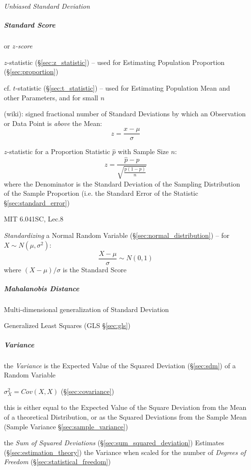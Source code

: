 \emph{Unbiased Standard Deviation}



\subparagraph{Standard Score}\label{sec:standard_score}\hfill

or \emph{$z$-score}

$z$-statistic (\S\ref{sec:z_statistic}) -- used for Estimating Population
Proportion (\S\ref{sec:proportion})

cf. $t$-statistic (\S\ref{sec:t_statistic}) -- used for Estimating Population
Mean and other Parameters, and for small $n$

(wiki): signed fractional number of Standard Deviations by which an Observation
or Data Point is \emph{above} the Mean:
\[
  z = \frac{x - \mu}{\sigma}
\]

$z$-statistic for a Proportion Statistic $\hat{p}$ with Sample Size $n$:
\[
  z = \frac{\hat{p} - p}{\sqrt{\frac{p(1-p)}{n}}}
\]
where the Denominator is the Standard Deviation of the Sampling Distribution of
the Sample Proportion (i.e. the Standard Error of the Statistic
\S\ref{sec:standard_error})

MIT 6.041SC, Lec.8

\emph{Standardizing} a Normal Random Variable (\S\ref{sec:normal_distribution})
-- for $X \sim N(\mu, \sigma^2)$:
\[
  \frac{X - \mu}{\sigma} \sim N(0, 1)
\]
where $(X - \mu)/\sigma$ is the Standard Score



\subparagraph{Mahalanobis Distance}\label{sec:mahalanobis_distance}\hfill

Multi-dimensional generalization of Standard Deviation

Generalized Least Squares (GLS \S\ref{sec:gls})



\subparagraph{Variance}\label{sec:variance}\hfill

the \emph{Variance} is the Expected Value of the Squared Deviation
(\S\ref{sec:sdm}) of a Random Variable

$\sigma_X^2 = Cov(X,X)$ (\S\ref{sec:covariance})

this is either equal to the Expected Value of the Square Deviation from the
Mean of a theoretical Distribution, or as the Squared Deviations from the Sample
Mean (Sample Variance \S\ref{sec:sample_variance})

the \emph{Sum of Squared Deviations} (\S\ref{sec:sum_squared_deviation})
Estimates (\S\ref{sec:estimation_theory}) the Variance when scaled for the
number of \emph{Degrees of Freedom} (\S\ref{sec:statistical_freedom})

